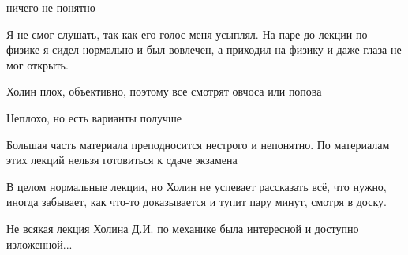             \begin{commentbox} 
                ничего не понятно 
            \end{commentbox} 
        
            \begin{commentbox} 
                Я не смог слушать, так как его голос меня усыплял. На паре до лекции по физике я сидел нормально и был вовлечен, а приходил на физику и даже глаза не мог открыть.  
            \end{commentbox} 
        
            \begin{commentbox} 
                Холин плох, объективно, поэтому все смотрят овчоса или попова 
            \end{commentbox} 
        
            \begin{commentbox} 
                Неплохо, но есть варианты получше 
            \end{commentbox} 
        
            \begin{commentbox} 
                Большая часть материала преподносится нестрого и непонятно. По материалам этих лекций нельзя готовиться к сдаче экзамена 
            \end{commentbox} 
        
            \begin{commentbox} 
                В целом нормальные лекции, но Холин не успевает рассказать всё, что нужно, иногда забывает, как что-то доказывается и тупит пару минут, смотря в доску.  
            \end{commentbox} 
        
            \begin{commentbox} 
                Не всякая лекция Холина Д.И. по механике была интересной и доступно изложенной... 
            \end{commentbox} 

